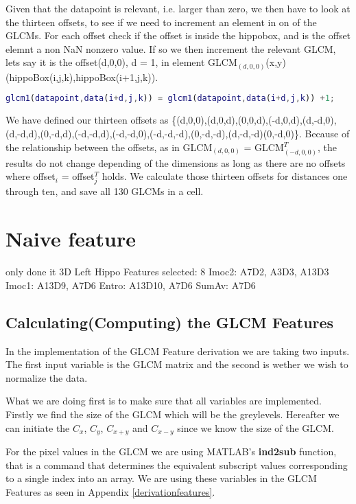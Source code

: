 Given that the datapoint is relevant, i.e. larger than zero, we then have to look at the thirteen offsets, to see if we need to increment an element in on of the GLCMs. For each offset check if the offset is inside the hippobox, and is the offset elemnt a non NaN nonzero value. If so we then increment the relevant GLCM, lets say it is the offset(d,0,0), d = 1, in element GLCM$_(d,0,0)$(x,y) (hippoBox(i,j,k),hippoBox(i+1,j,k)).

\begin{lstlisting}[language=Matlab]
            glcm1(datapoint,data(i+d,j,k)) = glcm1(datapoint,data(i+d,j,k)) +1;
\end{lstlisting}

We have defined our thirteen offsets as \{(d,0,0),(d,0,d),(0,0,d),(-d,0,d),(d,-d,0),(d,-d,d),(0,-d,d),(-d,-d,d),(-d,-d,0),(-d,-d,-d),(0,-d,-d),(d,-d,-d)(0,-d,0)\}.
Because of the relationship between the offsets, as in GLCM$_{(d,0,0)}$ = GLCM$_{(-d,0,0)}^T$, the results do not change depending of the dimensions as long as there are no offsets where offset$_i$ = offset$_j^T$ holds.
We calculate those thirteen offsets for distances one through ten, and save all 130 GLCMs in a cell.

\section{Naive feature}
only done it 3D
Left Hippo
Features selected: 8
Imoc2: A7D2, A3D3, A13D3
Imoc1: A13D9, A7D6
Entro: A13D10, A7D6
SumAv: A7D6

\subsection{Calculating(Computing) the GLCM Features}


In the implementation of the GLCM Feature derivation we are taking two inputs. The first input variable is the GLCM matrix and the second is wether we wish to normalize the data.

What we are doing first is to make sure that all variables are implemented. Firstly we find the size of the GLCM which will be the greylevels. Hereafter we can initiate the $C_x$, $C_y$, $C_{x+y}$ and $C_{x-y}$ since we know the size of the GLCM.

For the pixel values in the GLCM we are using MATLAB's \textbf{ind2sub} function, that is a command that determines the equivalent subscript values corresponding to a single index into an array. We are using these variables in the GLCM Features as seen in Appendix \ref{derivationfeatures}.

